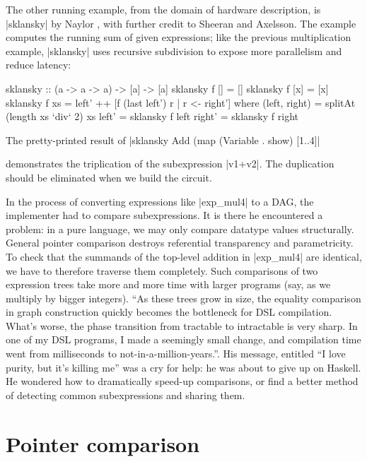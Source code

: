 \documentclass[submission,copyright,creativecommons]{eptcs}
\begin{document}
The other running example, from the domain of hardware description,
is |sklansky| by Naylor \cite{Naylor-sharing}, with further
credit to Sheeran and Axelsson.  The example computes the running sum
of given expressions; like the previous multiplication example,
|sklansky| uses recursive subdivision to expose more parallelism and
reduce latency:
\begin{code}
sklansky :: (a -> a -> a) -> [a] -> [a]
sklansky f [] = []
sklansky f [x] = [x]
sklansky f xs = left' ++ [f (last left') r | r <- right']
  where
    (left, right) = splitAt (length xs `div` 2) xs
    left'  = sklansky f left
    right' = sklansky f right
\end{code}
The pretty-printed result of |sklansky Add (map (Variable . show) [1..4]|
\begin{code}
["v1","(v1+v2)","((v1+v2)+v3)","((v1+v2)+(v3+v4))"]
\end{code}
demonstrates the triplication of the subexpression |v1+v2|. The
duplication should be eliminated when we build the circuit.

In the process of converting expressions like |exp_mul4| to a DAG,
the implementer \cite{Hawkins-CSE} had to compare subexpressions. It
is there he encountered a problem: in a pure language, we may only
compare datatype values structurally. General pointer comparison
destroys referential transparency and parametricity. To
check that the summands of the top-level addition in |exp_mul4| are
identical, we have to therefore traverse them completely. Such comparisons of
two expression trees take more and more time with larger programs
(say, as we multiply by bigger integers).  ``As
these trees grow in size, the equality comparison in graph
construction quickly becomes the bottleneck for DSL compilation.
What's worse, the phase transition from tractable to intractable is
very sharp.  In one of my DSL programs, I made a seemingly small
change, and compilation time went from milliseconds to
not-in-a-million-years.''\cite{Hawkins-CSE}.  His message, entitled
``I love purity, but it's killing me'' was a cry for help: he was
about to give up on Haskell.  He wondered how to dramatically speed-up
comparisons, or find a better method of detecting common
subexpressions and sharing them.

\section{Pointer comparison}
\label{s:ptr-cmp}
\end{document}
